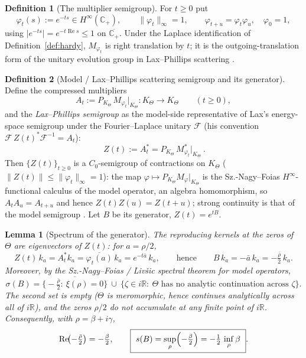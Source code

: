 \documentclass[11pt]{amsart}
\theoremstyle{plain}
\newtheorem{lemma}{Lemma}
\theoremstyle{definition}
\newtheorem{definition}{Definition}
\theoremstyle{remark}
\newcommand{\R}{\mathbb{R}}
\newcommand{\Cp}{\mathbb{C}_{+}}
\newcommand{\Hi}{H^{\infty}(\Cp)}
\newcommand{\Kt}{K_{\Theta}}
\newcommand{\norm}[1]{\lVert #1 \rVert}
\newcommand{\abs}[1]{\lvert #1 \rvert}
\renewcommand{\Re}{\operatorname{Re}}
\begin{document}
\begin{definition}[The multiplier semigroup]\label{def:multiplier}
For $t\ge0$ put
\[
  \varphi_{t}(s):=e^{-ts}\in\Hi,\qquad \norm{\varphi_{t}}_{\infty}=1,\qquad
  \varphi_{t+u}=\varphi_{t}\varphi_{u},\quad \varphi_{0}=1,
\]
using $\abs{e^{-ts}}=e^{-t\Re s}\le1$ on $\overline{\Cp}$. Under the Laplace
identification of Definition~\ref{def:hardy}, $M_{\varphi_{t}}$ is right translation by
$t$; it is the outgoing-translation form of the unitary evolution group in
Lax--Phillips scattering \cite{laxphillips,laxphillipsauto}.
\end{definition}

\begin{definition}[Model / Lax--Phillips scattering semigroup and its generator]\label{def:Z}
Define the compressed multipliers
\[
  A_{t}:=P_{\Kt}\,M_{\varphi_{t}}\big|_{\Kt}:\Kt\to\Kt\qquad(t\ge0),
\]
and the \emph{Lax--Phillips semigroup} as the model-side representative of Lax's
energy-space semigroup under the Fourier--Laplace unitary $\mathcal F$ (his convention
$\mathcal F\,Z(t)^{*}\mathcal F^{-1}=A_{t}$):
\begin{equation}\label{eq:Z}
  \boxed{\ Z(t):=A_{t}^{*}=P_{\Kt}\,M_{\varphi_{t}}^{*}\big|_{\Kt}\ }.
\end{equation}
Then $\{Z(t)\}_{t\ge0}$ is a $C_{0}$-semigroup of contractions on $\Kt$
($\norm{Z(t)}\le\norm{\varphi_{t}}_{\infty}=1$): the map
$\varphi\mapsto P_{\Kt}M_{\varphi}|_{\Kt}$ is the Sz.-Nagy--Foias $H^{\infty}$-functional
calculus of the model operator, an algebra homomorphism, so $A_{t}A_{u}=A_{t+u}$ and
hence $Z(t)Z(u)=Z(t+u)$; strong continuity is that of the model semigroup
\cite{sznagyfoias,nikolski}. Let $B$ be its generator, $Z(t)=e^{tB}$.
\end{definition}

\begin{lemma}[Spectrum of the generator]\label{lem:spectrum}
The reproducing kernels at the zeros of $\Theta$ are eigenvectors of $Z(t)$: for
$a=\rho/2$,
\begin{equation}\label{eq:eig}
  Z(t)\,k_{a}=A_{t}^{*}k_{a}=\overline{\varphi_{t}(a)}\,k_{a}=e^{-t\bar a}\,k_{a},
  \qquad\text{hence}\qquad B\,k_{a}=-\bar a\,k_{a}=-\tfrac{\bar\rho}{2}\,k_{a}.
\end{equation}
Moreover, by the Sz.-Nagy--Foias / Liv\v{s}ic spectral theorem for model operators,
\[
  \sigma(B)=\overline{\bigl\{-\tfrac{\bar\rho}{2}:\ \xi(\rho)=0\bigr\}}
  \ \cup\ \bigl\{\zeta\in i\R:\ \Theta\text{ has no analytic continuation across }\zeta\bigr\}.
\]
The second set is empty ($\Theta$ is meromorphic, hence continues analytically across all
of $i\R$), and the zeros $\rho/2$ do not accumulate at any finite point of $i\R$.
Consequently, with $\rho=\beta+i\gamma$,
\begin{equation}\label{eq:sB}
  \Re\!\bigl(-\tfrac{\bar\rho}{2}\bigr)=-\tfrac{\beta}{2},\qquad
  \boxed{\ s(B)=\sup_{\rho}\Bigl(-\tfrac{\beta}{2}\Bigr)=-\tfrac12\,\inf_{\rho}\beta\ }.
\end{equation}
\end{lemma}
\end{document}
